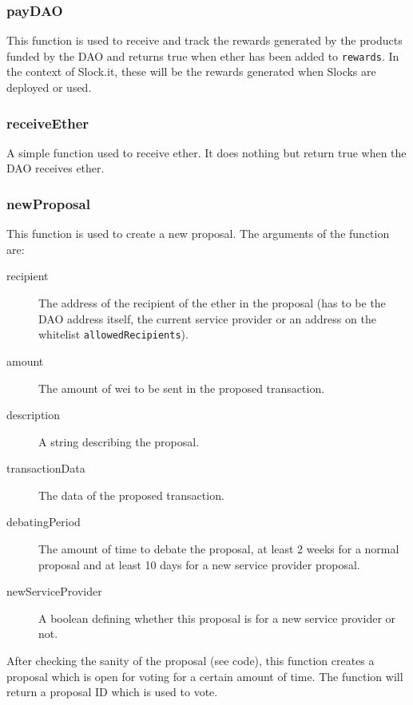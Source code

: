\documentclass[9pt,oneside]{amsart}
\begin{document}
\begin{multicols}{2}
\subsubsection*{payDAO}
This function is used to receive and track the rewards generated by the products funded by the DAO and returns true when ether has been added to \verb|rewards|. In the context of Slock.it, these will be the rewards generated when Slocks are deployed or used.

\subsubsection*{receiveEther}
A simple function used to receive ether. It does nothing but return true when the DAO receives ether.

\subsubsection*{newProposal}
This function is used to create a new proposal. The arguments of the function are:
\begin{description}
 \item[recipient] The address of the recipient of the ether in the proposal (has to be the DAO address itself, the current service provider or an address on the whitelist \verb|allowedRecipients|).
 \item[amount] The amount of wei to be sent in the proposed transaction.
 \item[description] A string describing the proposal.
 \item[transactionData] The data of the proposed transaction.
 \item[debatingPeriod] The amount of time to debate the proposal, at least 2 weeks for a normal proposal and at least 10 days for a new service provider proposal.
 \item[newServiceProvider] A boolean defining whether this proposal is for a new service provider or not.
\end{description}
After checking the sanity of the proposal (see code), this function creates a proposal which is open for voting for a certain amount of time. The function will return a proposal ID which is used to vote.


\end{multicols}
\end{document}
